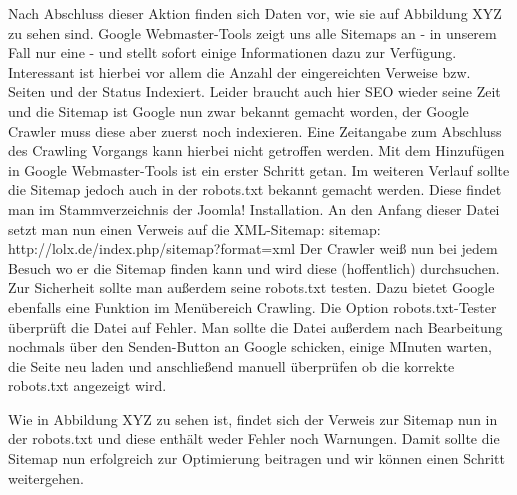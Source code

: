 Nach Abschluss dieser Aktion finden sich Daten vor, wie sie auf Abbildung XYZ zu sehen sind. Google Webmaster-Tools zeigt uns alle Sitemaps an - in unserem Fall nur eine - und stellt sofort einige Informationen dazu zur Verfügung. Interessant ist hierbei vor allem die Anzahl der eingereichten Verweise bzw. Seiten und der Status Indexiert. Leider braucht auch hier SEO wieder seine Zeit und die Sitemap ist Google nun zwar bekannt gemacht worden, der Google Crawler muss diese aber zuerst noch indexieren. Eine Zeitangabe zum Abschluss des Crawling Vorgangs kann hierbei nicht getroffen werden.
Mit dem Hinzufügen in Google Webmaster-Tools ist ein erster Schritt getan. Im weiteren Verlauf sollte die Sitemap jedoch auch in der robots.txt bekannt gemacht werden. Diese findet man im Stammverzeichnis der Joomla! Installation. An den Anfang dieser Datei setzt man nun einen Verweis auf die XML-Sitemap:
sitemap: http://lolx.de/index.php/sitemap?format=xml
Der Crawler weiß nun bei jedem Besuch wo er die Sitemap finden kann und wird diese (hoffentlich) durchsuchen. Zur Sicherheit sollte man außerdem seine robots.txt testen. Dazu bietet Google ebenfalls eine Funktion im Menübereich Crawling. Die Option robots.txt-Tester überprüft die Datei auf Fehler. Man sollte die Datei außerdem nach Bearbeitung nochmals über den Senden-Button an Google schicken, einige MInuten warten, die Seite neu laden und anschließend manuell überprüfen ob die korrekte robots.txt angezeigt wird.

Wie in Abbildung XYZ zu sehen ist, findet sich der Verweis zur Sitemap nun in der robots.txt und diese enthält weder Fehler noch Warnungen. Damit sollte die Sitemap nun erfolgreich zur Optimierung beitragen und wir können einen Schritt weitergehen.




